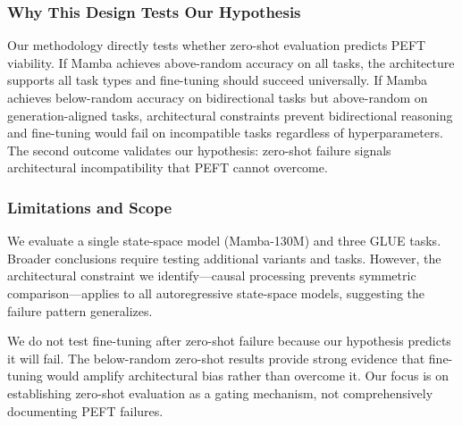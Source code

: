 \subsubsection{Why This Design Tests Our Hypothesis}

Our methodology directly tests whether zero-shot evaluation predicts PEFT viability. If Mamba achieves above-random accuracy on all tasks, the architecture supports all task types and fine-tuning should succeed universally. If Mamba achieves below-random accuracy on bidirectional tasks but above-random on generation-aligned tasks, architectural constraints prevent bidirectional reasoning and fine-tuning would fail on incompatible tasks regardless of hyperparameters. The second outcome validates our hypothesis: zero-shot failure signals architectural incompatibility that PEFT cannot overcome.

\subsubsection{Limitations and Scope}

We evaluate a single state-space model (Mamba-130M) and three GLUE tasks. Broader conclusions require testing additional variants and tasks. However, the architectural constraint we identify---causal processing prevents symmetric comparison---applies to all autoregressive state-space models, suggesting the failure pattern generalizes.

We do not test fine-tuning after zero-shot failure because our hypothesis predicts it will fail. The below-random zero-shot results provide strong evidence that fine-tuning would amplify architectural bias rather than overcome it. Our focus is on establishing zero-shot evaluation as a gating mechanism, not comprehensively documenting PEFT failures.
